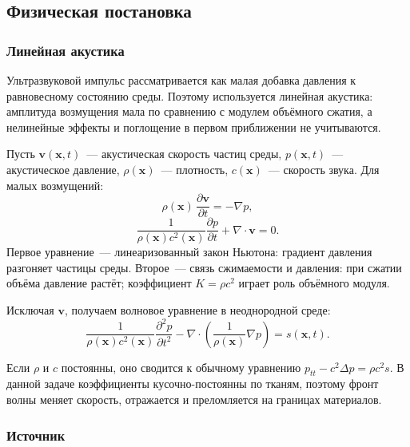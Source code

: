 \subsection{Физическая постановка}

\subsubsection{Линейная акустика}

Ультразвуковой импульс рассматривается как малая добавка давления
к равновесному состоянию среды. Поэтому используется линейная акустика:
амплитуда возмущения мала по сравнению с модулем объёмного сжатия,
а нелинейные эффекты и поглощение в первом приближении не учитываются.

Пусть $\mathbf{v}(\mathbf{x},t)$~--- акустическая скорость частиц среды,
$p(\mathbf{x},t)$~--- акустическое давление, $\rho(\mathbf{x})$~---
плотность, $c(\mathbf{x})$~--- скорость звука. Для малых возмущений:
\begin{equation}
  \rho(\mathbf{x})\,\frac{\partial \mathbf{v}}{\partial t}
  = -\nabla p,
\end{equation}
\begin{equation}
  \frac{1}{\rho(\mathbf{x})c^2(\mathbf{x})}
  \frac{\partial p}{\partial t}
  + \nabla\cdot\mathbf{v} = 0.
\end{equation}
Первое уравнение~--- линеаризованный закон Ньютона: градиент давления
разгоняет частицы среды. Второе~--- связь сжимаемости и давления:
при сжатии объёма давление растёт; коэффициент
$K=\rho c^2$ играет роль объёмного модуля.

Исключая $\mathbf{v}$, получаем волновое уравнение в неоднородной среде:
\begin{equation}\label{eq:acoustic_strong}
  \frac{1}{\rho(\mathbf{x})c^2(\mathbf{x})}
  \frac{\partial^2 p}{\partial t^2}
  - \nabla\cdot\left(
      \frac{1}{\rho(\mathbf{x})}\nabla p
    \right)
  = s(\mathbf{x},t).
\end{equation}

Если $\rho$ и $c$ постоянны, оно сводится к обычному уравнению
$p_{tt}-c^2\Delta p = \rho c^2 s$. В данной задаче коэффициенты
кусочно-постоянны по тканям, поэтому фронт волны меняет скорость,
отражается и преломляется на границах материалов.

\subsubsection{Источник}

